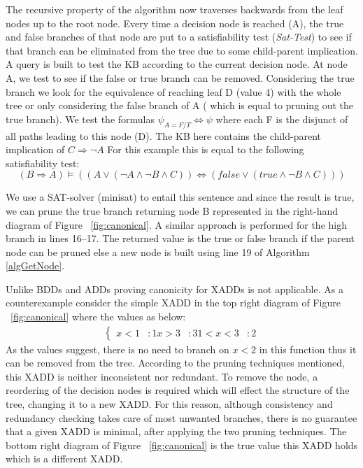 \documentclass[twoside,11pt]{article}
\begin{document}
The recursive property of the algorithm now traverses backwards from the leaf nodes up to the root node. Every time a decision node is reached (A), the true and false branches of that node are put to a satisfiability test (\emph{Sat-Test}) to see if that branch can be eliminated from the tree due to some child-parent implication. A query is built to test the KB according to the current decision node. At node A, we test to see if the false or true branch can be removed. Considering the true branch we look for the equivalence of reaching leaf D (value 4) with the whole tree or only considering the false branch of A ( which is equal to pruning out the true branch). We test the formulas $\psi_{A=F/T} \Longleftrightarrow \psi$ where each F is the disjunct of all paths leading to this node (D). The KB here contains the child-parent implication of $C \Rightarrow \neg A$ For this example this is equal to the following satisfiability test: 
\begin{equation*}
(B \Rightarrow A) \models ((A \vee (\neg A \wedge \neg B \wedge C))\Longleftrightarrow(\mathit{false} \vee (\mathit{true} \wedge \neg B \wedge C)))
\end{equation*}

We use a SAT-solver (minisat) to entail this sentence and since the result is true, we can prune the true branch returning node B represented in the right-hand diagram of  Figure ~\ref{fig:canonical}. A similar approach is performed for the high branch in lines 16--17. The returned value is the true or false branch if the parent node can be pruned else a new node is built using line 19 of Algorithm \ref{algGetNode}. 

Unlike BDDs and ADDs proving canonicity for XADDs is not applicable. As a counterexample consider the simple XADD in the top right diagram of Figure ~\ref{fig:canonical} where the values as below: 
\begin{align*}
\begin{cases}
x<1&: 1 
x>3&:3
1<x<3&: 2
\end{cases}
\end{align*}
As the values suggest, there is no need to branch on $x<2$ in this function thus it can be removed from the tree. According to the pruning techniques mentioned, this XADD is neither inconsistent nor redundant. To remove the node, a reordering of the decision nodes is required which will effect the structure of the tree, changing it to a new XADD. For this reason, although consistency and redundancy checking takes care of most unwanted branches, there is no guarantee that a given XADD is minimal,  after applying the two pruning techniques. The bottom right diagram of Figure ~\ref{fig:canonical} is the true value this XADD holds which is a different XADD.
\end{document}
